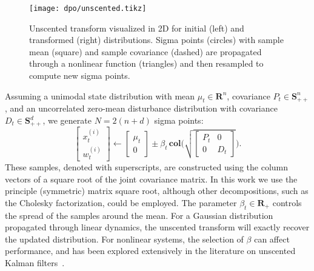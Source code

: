 \begin{figure}[H]
	\begin{center}
		\texttt{[image: dpo/unscented.tikz]}
	\end{center}
	\caption[Unscented transform visualization]{Unscented transform visualized in 2D for initial (left) and transformed (right) distributions. Sigma points (circles) with sample mean (square) and sample covariance (dashed) are propagated through a nonlinear function (triangles) and then resampled to compute new sigma points.}
	\label{dpo_unscented}
\end{figure}

Assuming a unimodal state distribution with mean $\mu_t \in \mathbf{R}^n$, covariance $P_t \in \mathbf{S}_{++}^{n}$, and an uncorrelated zero-mean disturbance distribution with covariance $D_t \in \mathbf{S}_{++}^{d}$, we generate $N = 2(n + d)$ sigma points:
\begin{equation}
	\begin{bmatrix} x_t^{(i)} \\ w_t^{(i)} \end{bmatrix} \leftarrow \begin{bmatrix} \mu_t \\ 0 \end{bmatrix} \pm \beta_t \, \mathbf{col} \Bigg( \sqrt{\begin{bmatrix}P_t & 0 \\ 0 & D_t \end{bmatrix}} \Bigg).
	\label{dpo_sigma_point_update}
\end{equation}
These samples, denoted with superscripts, are constructed using the column vectors of a square root of the joint covariance matrix. In this work we use the principle (symmetric) matrix square root, although other decompositions, such as the Cholesky factorization, could be employed. The parameter $\beta_t \in \mathbf{R}_{+}$ controls the spread of the samples around the mean. For a Gaussian distribution propagated through linear dynamics, the unscented transform will exactly recover the updated distribution. For nonlinear systems, the selection of $\beta$ can affect performance, and has been explored extensively in the literature on unscented Kalman filters~\cite{menegaz2015systematization}.

